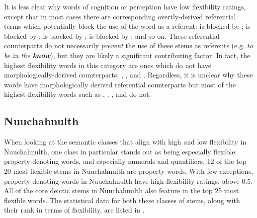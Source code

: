 It is less clear why words of cognition or perception have low flexibility ratings, except that in most cases there are corresponding overtly-derived referential terms which potentially block the use of the word as a referent:  is blocked by ;  is blocked by ;  is blocked by ;  is blocked by ; and so on. These referential counterparts do not necessarily \emph{prevent} the use of these stems as referents (e.g. \textit{to be in the \textbf{know}}), but they are likely a significant contributing factor. In fact, the highest flexibility words in this category are ones which do not have morphologically-derived counterparts: , , and . Regardless, it is unclear why these words have morphologically derived referential counterparts but most of the highest-flexibility words such as , , , and  do not.

\subsection{Nuuchahnulth}
\label{sec:4.6.2}

When looking at the semantic classes that align with high and low flexibility in Nuuchahnulth, one class in particular stands out as being especially flexible: property-denoting words, and especially numerals and quantifiers. 12 of the top 20 most flexible stems in Nuuchahnulth are property words. With few exceptions, property-denoting words in Nuuchahnulth have high flexibility ratings, above $0.5$. All of the core deictic stems in Nuuchahnulth also feature in the top 25 most flexible words. The statistical data for both these classes of stems, along with their rank in terms of flexibility, are listed in .

